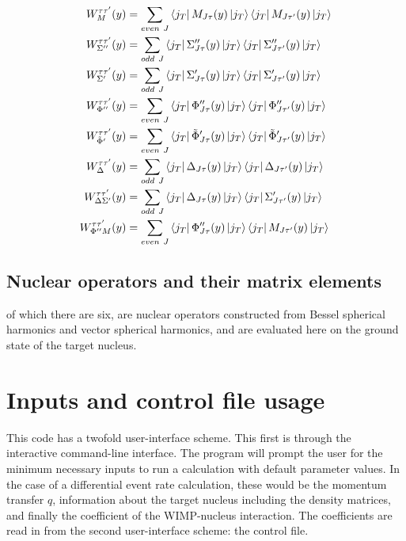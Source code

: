 \documentclass[11pt]{amsart}
\begin{document}
 
\begin{align}
W_M^{\tau\tau'}(y) &= \sum_{even\ J} 
\bra{j_T}M_{J\tau}(y)\ket{j_T}
\bra{j_T}M_{J\tau'}(y)\ket{j_T}
\\
W_{\Sigma''}^{\tau\tau'}(y) &= \sum_{odd\ J} 
\bra{j_T}{\Sigma''}_{J\tau}(y)\ket{j_T}
\bra{j_T}{\Sigma''}_{J\tau'}(y)\ket{j_T}
\\
W_{\Sigma'}^{\tau\tau'}(y) &= \sum_{odd\ J} 
\bra{j_T}{\Sigma'}_{J\tau}(y)\ket{j_T}
\bra{j_T}{\Sigma'}_{J\tau'}(y)\ket{j_T}
\\
W_{\Phi''}^{\tau\tau'}(y) &= \sum_{even\ J} 
\bra{j_T}{\Phi''}_{J\tau}(y)\ket{j_T}
\bra{j_T}{\Phi''}_{J\tau'}(y)\ket{j_T}
\\
W_{\tilde{\Phi}'}^{\tau\tau'}(y) &= \sum_{even\ J} 
\bra{j_T}{\tilde{\Phi}'}_{J\tau}(y)\ket{j_T}
\bra{j_T}{\tilde{\Phi}'}_{J\tau'}(y)\ket{j_T}
\\
W_{\Delta}^{\tau\tau'}(y) &= \sum_{odd\ J} 
\bra{j_T}{\Delta}_{J\tau}(y)\ket{j_T}
\bra{j_T}{\Delta}_{J\tau'}(y)\ket{j_T}
\\
W_{\Delta\Sigma'}^{\tau\tau'}(y) &= \sum_{odd\ J} 
\bra{j_T}{\Delta}_{J\tau}(y)\ket{j_T}
\bra{j_T}{\Sigma'}_{J\tau'}(y)\ket{j_T}
\\
W_{\Phi''M}^{\tau\tau'}(y) &= \sum_{even\ J} 
\bra{j_T}{\Phi''}_{J\tau}(y)\ket{j_T}
\bra{j_T}{M}_{J\tau'}(y)\ket{j_T}
\end{align}


\subsection{Nuclear operators and their matrix elements}
of which there are six, are nuclear operators constructed from Bessel spherical harmonics and vector spherical harmonics, and are evaluated here on the ground state of the target nucleus.

\section{Inputs and control file usage}
This code has a twofold user-interface scheme. This first is through the interactive command-line interface. The program will prompt the user for the minimum necessary inputs to run a calculation with default parameter values. In the case of a differential event rate calculation, these would be the momentum transfer $q$, information about the target nucleus including the density matrices, and finally the coefficient of the WIMP-nucleus interaction. The coefficients are read in from the second user-interface scheme: the control file. 
\end{document}
